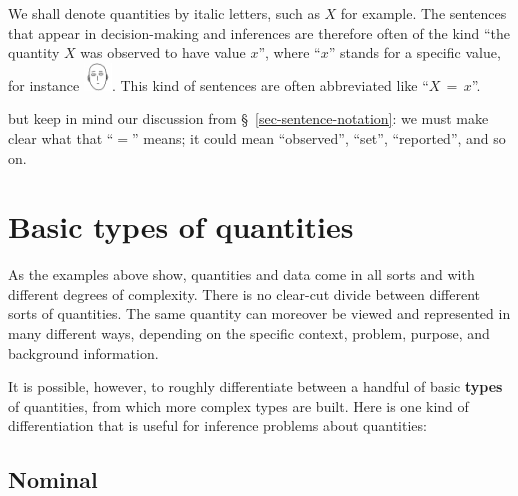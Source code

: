 \documentclass[
  a4paper,
  DIV=11,
  numbers=noendperiod,
  oneside]{scrreprt}
\begin{document}
We shall denote quantities by italic letters, such as \(X\) for example.
The sentences that appear in decision-making and inferences are
therefore often of the kind ``the quantity \(X\) was observed to have
value \(x\)'', where {``\(x\)''} stands for a specific value, for
instance
\includegraphics[width=2em,height=\textheight]{saitama_image.png}. This
kind of sentences are often abbreviated like ``\(X\mathord{\,=\,}x\)''.

\begin{tcolorbox}[enhanced jigsaw, colback=white, toptitle=1mm, title={}, arc=.35mm, toprule=.15mm, rightrule=.15mm, coltitle=black, opacityback=0, colframe=quarto-callout-warning-color-frame, bottomtitle=1mm, colbacktitle=quarto-callout-warning-color!10!white, left=2mm, leftrule=.75mm, titlerule=0mm, breakable, opacitybacktitle=0.6, bottomrule=.15mm]

 but keep in mind our discussion from
§~\ref{sec-sentence-notation}: we must make clear what that ``\(=\)''
means; it could mean ``observed'', ``set'', ``reported'', and so on.

\end{tcolorbox}

\hypertarget{basic-types-of-quantities}{%
\section{Basic types of quantities}\label{basic-types-of-quantities}}

As the examples above show, quantities and data come in all sorts and
with different degrees of complexity. There is no clear-cut divide
between different sorts of quantities. The same quantity can moreover be
viewed and represented in many different ways, depending on the specific
context, problem, purpose, and background information.

It is possible, however, to roughly differentiate between a handful of
basic {\textbf{types}} of quantities, from which more complex types are
built. Here is one kind of differentiation that is useful for inference
problems about quantities:

\hypertarget{nominal}{%
\subsection{Nominal}\label{nominal}}
\end{document}
